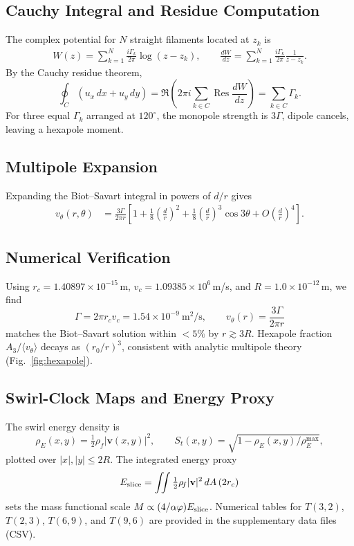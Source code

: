 \documentclass[10pt,reprint,aps,onecolumn,nofootinbib]{revtex4-2}
\begin{document}
\subsection{Cauchy Integral and Residue Computation}
    The complex potential for $N$ straight filaments located at $z_k$ is
    \begin{align}
        W(z)=\sum_{k=1}^{N}\frac{i\Gamma_k}{2\pi}\log(z-z_k),
        \qquad
        \frac{dW}{dz}=\sum_{k=1}^{N}\frac{i\Gamma_k}{2\pi}\frac{1}{z-z_k}.
    \end{align}
    By the Cauchy residue theorem,
    \[
        \oint_{C} (u_x\,dx+u_y\,dy)
        =\Re\!\left(2\pi i\sum_{k\in C}\operatorname{Res}\frac{dW}{dz}\right)
        =\sum_{k\in C}\Gamma_k.
    \]
    For three equal $\Gamma_k$ arranged at $120^\circ$, the monopole strength is $3\Gamma$,
    dipole cancels, leaving a hexapole moment.

\subsection{Multipole Expansion}
    Expanding the Biot--Savart integral in powers of $d/r$ gives
    \begin{align}
        v_\theta(r,\theta)
        &=\frac{3\Gamma}{2\pi r}\left[1+\frac{1}{8}\!\left(\frac{d}{r}\right)^2
        +\frac{1}{8}\!\left(\frac{d}{r}\right)^3\cos3\theta+O\!\left(\frac{d}{r}\right)^4\right].
    \end{align}

\subsection{Numerical Verification}
    Using $r_c=1.40897\times10^{-15}\,$m, $v_c=1.09385\times10^{6}\,$m/s, and
    $R=1.0\times10^{-12}\,$m, we find
    \[
        \Gamma=2\pi r_c v_c=1.54\times 10^{-9}\ \mathrm{m^2/s},\qquad
        v_\theta(r)=\frac{3\Gamma}{2\pi r}
    \]
    matches the Biot--Savart solution within $<5\%$ by $r\gtrsim 3R$. Hexapole fraction
    $A_3/\langle v_\theta\rangle$ decays as $(r_0/r)^3$, consistent with analytic
    multipole theory (Fig.~\ref{fig:hexapole}).

\subsection{Swirl-Clock Maps and Energy Proxy}
    The swirl energy density is
    \[
        \rho_{\!E}(x,y)=\tfrac12 \rho_{\!f}|\mathbf{v}(x,y)|^2,
        \qquad
        S_t(x,y)=\sqrt{1-\rho_{\!E}(x,y)/\rho_{\!E}^{\max}},
    \]
    plotted over $|x|,|y|\le 2R$. The integrated energy proxy
    \[
        E_{\rm slice}=\iint \tfrac12 \rho_{\!f}|\mathbf{v}|^2\,dA\,(2r_c)
    \]
    sets the mass functional scale $M\propto (4/\alpha\varphi) E_{\rm slice}$.
    Numerical tables for $T(3,2)$, $T(2,3)$, $T(6,9)$, and $T(9,6)$ are provided
    in the supplementary data files (CSV).
\end{document}
